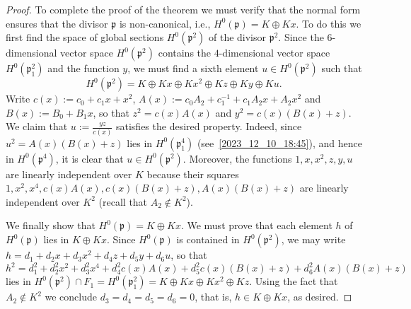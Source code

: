 \documentclass[12pt,reqno]{amsart}
\newcommand{\toda}[2][]{\todo[color=blue!30, #1]{#2}} %
\theoremstyle{definition}
\newcommand{\pp}{\mathfrak{p}}
\begin{document}
\begin{proof}
To complete the proof of the theorem we must verify that the normal form ensures that the divisor $\pp$ is non-canonical, i.e., $H^0(\pp) = K\oplus Kx$.
To do this we first find the space of global sections $H^0(\pp^2)$ of the divisor $\pp^2$.
Since the $6$-dimensional vector space $H^0(\pp^2)$ contains the $4$-dimensional vector space $H^0(\pp_1^2)$ and the function $y$, we must find a sixth element $u\in H^0(\pp^2)$ such that
\begin{equation*}%
    H^0(\pp^2)=K\oplus Kx\oplus Kx^2 \oplus Kz \oplus Ky \oplus Ku.
\end{equation*}
Write $c(x):= c_0 + c_1 x + x^2$, $A(x):= c_0 A_2 + c_1^{-1} + c_1 A_2 x + A_2 x^2$ and $B(x) := B_0 + B_1 x$, so that $z^2 = c(x) A(x)$ and $y^2 = c(x) (B(x) + z)$.
We claim that $u:=\frac{yz}{c(x)}$ satisfies the desired property. Indeed, since $u^2=A(x) (B(x)+z)$ lies in $H^0(\pp_1^4)$ (see~\eqref{2023_12_10_18:45}),
and hence in $H^0(\pp^4)$, it is clear that $u\in H^0(\pp^2)$. Moreover, the functions $1,x,x^2,z,y,u$ are linearly independent over $K$ because their squares $1,x^2,x^4,c(x) A(x),c(x)(B(x)+z), A(x)(B(x)+z)$ are linearly independent over $K^2$ (recall that $A_2\notin K^2$).
    
We finally show that $H^0(\pp) = K\oplus Kx$. We must prove that each element $h$ of $H^0(\pp)$ lies in $K\oplus Kx$. 
Since $H^0(\pp)$ is contained in $H^0(\pp^2)$, we may write $h=d_1 + d_2 x + d_3 x^2 + d_4 z + d_5 y + d_6 u$, so that
\[ h^2 = d_1^2 + d_2^2 x^2 + d_3^2 x^4 + d_4^2 c(x) A(x) + d_5^2 c(x) (B(x) + z) + d_6^2 A(x) (B(x) + z)\]
lies in $H^0(\pp^2) \cap F_1 = H^0(\pp_1^2)=K\oplus Kx \oplus Kx^2 \oplus Kz$. 
Using the fact that $A_2\notin K^2$ we conclude $d_3=d_4=d_5=d_6=0$, that is, $h\in K\oplus Kx$, as desired.
\end{proof}
\end{document}
